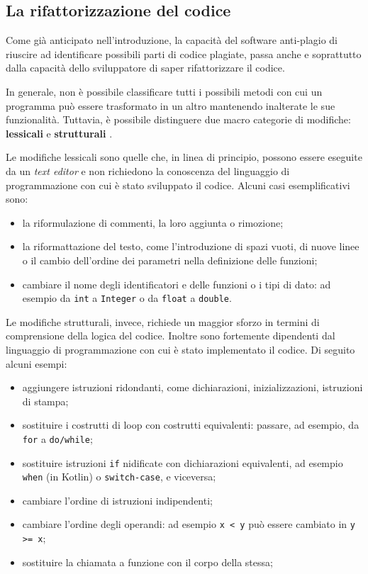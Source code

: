 \subsection{La rifattorizzazione del codice}
Come già anticipato nell'introduzione, la capacità del software anti-plagio di riuscire ad identificare possibili parti di codice plagiate, passa anche e soprattutto dalla capacità dello sviluppatore di saper rifattorizzare il codice.

In generale, non è possibile classificare tutti i possibili metodi con cui un programma può essere trasformato in un altro mantenendo inalterate le sue funzionalità.
%
Tuttavia, è possibile distinguere due macro categorie di modifiche: \textbf{lessicali} e \textbf{strutturali} \cite{joy-99}.

Le modifiche lessicali sono quelle che, in linea di principio, possono essere eseguite da un \textit{text editor} e non richiedono la conoscenza del linguaggio di programmazione con cui è stato sviluppato il codice. 
%
Alcuni casi esemplificativi sono:
\begin{itemize}
    \item la riformulazione di commenti, la loro aggiunta o rimozione;
    \item la riformattazione del testo, come l'introduzione di spazi vuoti, di nuove linee o il cambio dell'ordine dei parametri nella definizione delle funzioni;
    \item cambiare il nome degli identificatori e delle funzioni o i tipi di dato: ad esempio da \texttt{int} a \texttt{Integer} o da \texttt{float} a \texttt{double}.
\end{itemize}

Le modifiche strutturali, invece, richiede un maggior sforzo in termini di comprensione della logica del codice. Inoltre sono fortemente dipendenti dal linguaggio di programmazione con cui è stato implementato il codice. 
%
Di seguito alcuni esempi:
\begin{itemize}
    \item aggiungere istruzioni ridondanti, come dichiarazioni, inizializzazioni, istruzioni di stampa;
    \item sostituire i costrutti di loop con costrutti equivalenti: passare, ad esempio, da \texttt{for} a \texttt{do/while};
    \item sostituire istruzioni \texttt{if} nidificate con dichiarazioni equivalenti, ad esempio \texttt{when} (in Kotlin) o \texttt{switch-case}, e viceversa;
    \item cambiare l'ordine di istruzioni indipendenti;
    \item cambiare l'ordine degli operandi: ad esempio \texttt{x < y} può essere cambiato in \texttt{y >= x};
    \item sostituire la chiamata a funzione con il corpo della stessa;
\end{itemize}

